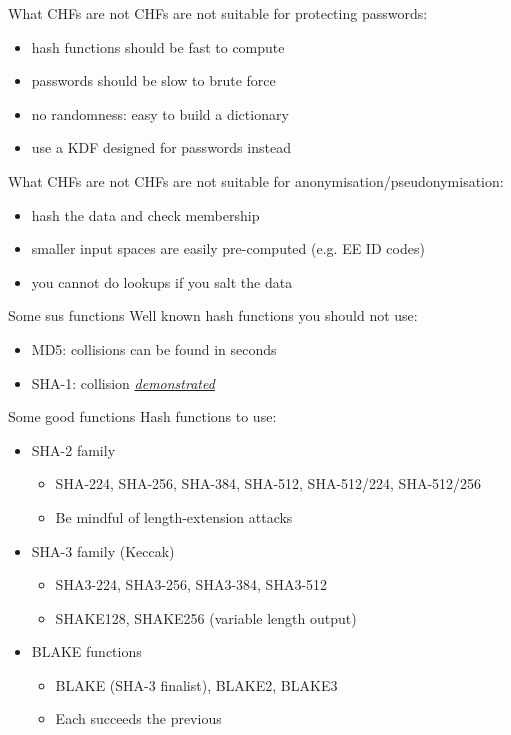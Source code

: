 \begin{frame}{What CHFs are not}
  CHFs are not suitable for protecting passwords:
  \begin{itemize}[<+(1)->]
    \item hash functions should be fast to compute
    \item passwords should be slow to brute force
    \item no randomness: easy to build a dictionary
    \item use a KDF designed for passwords instead
  \end{itemize}
\end{frame}

\begin{frame}{What CHFs are not}
  CHFs are not suitable for anonymisation/pseudonymisation:
  \begin{itemize}[<+(1)->]
    \item hash the data and check membership
    \item smaller input spaces are easily pre-computed (e.g. EE ID codes)
    \item you cannot do lookups if you salt the data
  \end{itemize}
\end{frame}

\begin{frame}{Some sus functions}
  Well known hash functions you should not use:
  \begin{itemize}[<+(1)->]
    \item MD5: collisions can be found in seconds
    \item SHA-1: collision \href{https://shattered.io}{\textit{demonstrated}}
  \end{itemize}
\end{frame}

\begin{frame}{Some good functions}
  Hash functions to use:
  \begin{itemize}[<+(1)->]
    \item SHA-2 family
    \begin{itemize}
      \item SHA-224, SHA-256, SHA-384, SHA-512, SHA-512/224, SHA-512/256
      \item Be mindful of length-extension attacks
    \end{itemize}
    \item SHA-3 family (Keccak)
    \begin{itemize}
      \item SHA3-224, SHA3-256, SHA3-384, SHA3-512
      \item SHAKE128, SHAKE256 (variable length output)
    \end{itemize}
    \item BLAKE functions
    \begin{itemize}
      \item BLAKE (SHA-3 finalist), BLAKE2, BLAKE3
      \item Each succeeds the previous
    \end{itemize}
  \end{itemize}
\end{frame}

